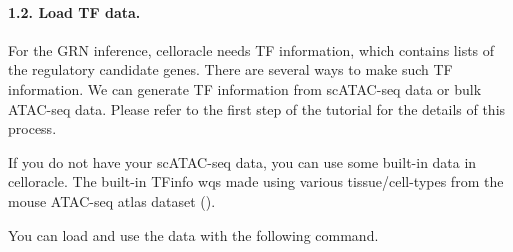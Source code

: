 \documentclass[letterpaper,10pt,english]{sphinxmanual}
\begin{document}
\paragraph{1.2. Load TF data.}
\label{\detokenize{notebooks/04_Network_analysis/Network_analysis_with_with_Paul_etal_2015_data:1.2.-Load-TF-data.}}
For the GRN inference, celloracle needs TF information, which contains lists of the regulatory candidate genes. There are several ways to make such TF information. We can generate TF information from scATAC-seq data or bulk ATAC-seq data. Please refer to the first step of the tutorial for the details of this process.

If you do not have your scATAC-seq data, you can use some built-in data in celloracle. The built-in TFinfo wqs made using various tissue/cell-types from the mouse ATAC-seq atlas dataset ().

You can load and use the data with the following command.

{
\begin{sphinxVerbatim}[commandchars=\\\{\}]
\llap{\color{nbsphinxin}[7]:\,\hspace{\fboxrule}\hspace{\fboxsep}}
  

\end{sphinxVerbatim}
}
\end{document}
